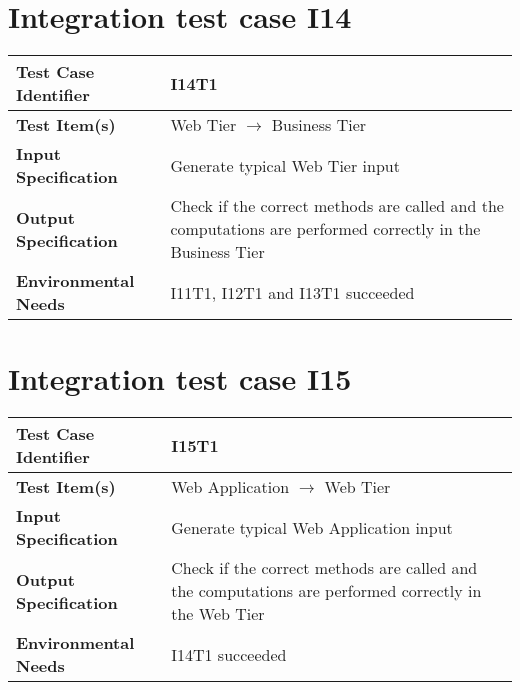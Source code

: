 \section{Integration test case I14}\label{I14}
\begin{center}
	\vspace{0.6cm}
	\begin{tabular}{|l|p{10cm}|}
		\hline
		\textbf{Test Case Identifier} & I14T1 \bigstrut \\\hline
		\textbf{Test Item(s)} & Web Tier \ensuremath{\rightarrow} Business Tier \bigstrut \\\hline
		\textbf{Input Specification} & Generate typical Web Tier input \bigstrut \\\hline
		\textbf{Output Specification} & Check if the correct methods are called and the computations are performed correctly in the Business Tier \bigstrut \\\hline
		\textbf{Environmental Needs} & I11T1, I12T1 and I13T1 succeeded \bigstrut \\\hline
	\end{tabular}
\end{center}

\section{Integration test case I15}\label{I15}
\begin{center}
	\vspace{0.6cm}
	\begin{tabular}{|l|p{10cm}|}
		\hline
		\textbf{Test Case Identifier} & I15T1 \bigstrut \\\hline
		\textbf{Test Item(s)} & Web Application \ensuremath{\rightarrow} Web Tier \bigstrut \\\hline
		\textbf{Input Specification} & Generate typical Web Application input \bigstrut \\\hline
		\textbf{Output Specification} & Check if the correct methods are called and the computations are performed correctly in the Web Tier \bigstrut \\\hline
		\textbf{Environmental Needs} & I14T1 succeeded \bigstrut \\\hline
	\end{tabular}
\end{center}

